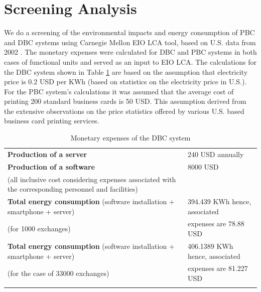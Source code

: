 \documentclass[3p,times,procedia]{elsarticle}
\begin{document}
\section{Screening Analysis} \label{ScreeningLCA}

We do a screening of the environmental impacts and energy consumption of PBC and DBC systems using Carnegie Mellon EIO LCA tool, based on U.S. data from 2002 \cite{Mellon}. The monetary expenses were calculated for DBC and PBC systems in both cases of functional units and served as an input to EIO LCA. The calculations for the DBC system shown in Table \ref{PBCcalc} are based on the assumption that electricity price is 0.2 USD per KWh (based on statistics on the electricity price in U.S.). For the PBC system's calculations it was assumed that the average cost of printing 200 standard business cards is 50 USD. This assumption derived from the extensive observations on the price statistics offered by various U.S. based business card printing services.

\begin{table}[h]
\label{PBCcalc}
\caption{Monetary expenses of the DBC system}
\begin{tabular*}{\hsize}{@{\extracolsep{\fill}}ll@{}}
\colrule
\textbf{Production of a server} & 240 USD annually \\
\textbf{Production of a software}  &   8000 USD \\
(all inclusive cost considering expenses associated with the corresponding personnel and facilities) &  \\
\textbf{Total energy consumption} (software installation + smartphone + server) &  394.439 KWh hence, associated \\
(for 1000 exchanges) & expenses are 78.88 USD \\
\textbf{Total energy consumption} (software installation + smartphone + server) & 406.1389 KWh hence, associated  \\
(for the case of 33000 exchanges) & expenses are 81.227 USD  \\
\botrule
\end{tabular*}
\end{table}
\end{document}
